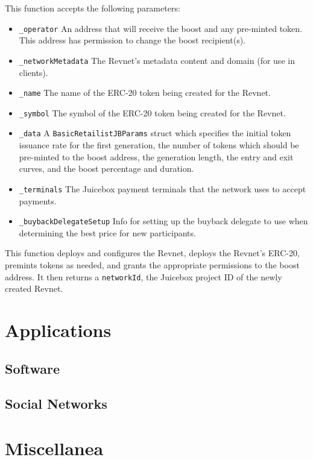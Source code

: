 \documentclass{article}
\begin{document}
This function accepts the following parameters:

\begin{itemize}
  \item \texttt{\_operator} An address that will receive the boost and any pre-minted token. This address has permission to change the boost recipient(s).
  \item \texttt{\_networkMetadata} The Revnet's metadata content and domain (for use in clients).
  \item \texttt{\_name} The name of the ERC-20 token being created for the Revnet.
  \item \texttt{\_symbol} The symbol of the ERC-20 token being created for the Revnet.
  \item \texttt{\_data} A \texttt{BasicRetailistJBParams} struct which specifies the initial token issuance rate for the first generation, the number of tokens which should be pre-minted to the boost address, the generation length, the entry and exit curves, and the boost percentage and duration.
  \item \texttt{\_terminals} The Juicebox payment terminals that the network uses to accept payments.
  \item \texttt{\_buybackDelegateSetup} Info for setting up the buyback delegate to use when determining the best price for new participants.
\end{itemize}

This function deploys and configures the Revnet, deploys the Revnet's ERC-20, premints tokens as needed, and grants the appropriate permissions to the boost address. It then returns a \texttt{networkId}, the Juicebox project ID of the newly created Revnet.

\section{Applications}

\subsection{Software}

\subsection{Social Networks}

\section{Miscellanea}
\end{document}
